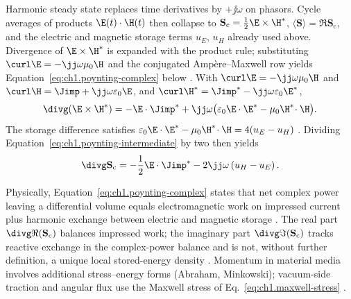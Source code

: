 Harmonic steady state replaces time derivatives by $+\jj\omega$ on phasors. Cycle averages of products $\E(t)\cdot\H(t)$ then collapse to $\mathbf{S}_\mathrm{c}=\tfrac12\E\times\H^*$, $\langle\mathbf{S}\rangle=\Re\mathbf{S}_\mathrm{c}$, and the electric and magnetic storage terms $u_E$, $u_H$ already used above. Divergence of $\E\times\H^*$ is expanded with the product rule; substituting $\curl\E=-\jj\omega\mu_0\H$ and the conjugated Amp\`ere--Maxwell row yields Equation~\eqref{eq:ch1.poynting-complex} below \cite{stratton1941,harrington2001}.
With $\curl\E=-\jj\omega\mu_0\H$ and
$\curl\H=\Jimp+\jj\omega\varepsilon_0\E$, and $\curl\H^*=\Jimp^*-\jj\omega\varepsilon_0\E^*$,
\begin{equation}
\label{eq:ch1.poynting-intermediate}
\divg(\E\times\H^*)
=-\E\cdot\Jimp^*
+\jj\omega\bigl(\varepsilon_0\E\cdot\E^*-\mu_0\H^*\!\cdot\H\bigr).
\end{equation}
The storage difference satisfies
$\varepsilon_0\E\cdot\E^*-\mu_0\H^*\!\cdot\H=4(u_E-u_H)$ \cite{stratton1941}.
Dividing Equation~\eqref{eq:ch1.poynting-intermediate} by two then yields
\begin{equation}
\label{eq:ch1.poynting-average}\divg\mathbf{S}_\mathrm{c}
=-\frac{1}{2}\E\cdot\Jimp^*
-2\jj\omega\left(u_H-u_E\right).
\end{equation}
\addtocounter{equation}{-1}\label{eq:ch1.dual-invariant-poynting}%
\addtocounter{equation}{-1}\label{eq:ch1.poynting-complex}%
Physically, Equation~\eqref{eq:ch1.poynting-complex} states that net complex power leaving a differential volume equals electromagnetic work on impressed current plus harmonic exchange between electric and magnetic storage \cite{poynting1884}. The real part $\divg\Re(\mathbf{S}_\mathrm{c})$ balances impressed work; the imaginary part $\divg\Im(\mathbf{S}_\mathrm{c})$ tracks reactive exchange in the complex-power balance and is not, without further definition, a unique local stored-energy density \cite{stratton1941}. Momentum in material media involves additional stress--energy forms (Abraham, Minkowski); vacuum-side traction and angular flux use the Maxwell stress of Eq.~\eqref{eq:ch1.maxwell-stress} \cite{abraham1910,minkowski1908,stratton1941}.

